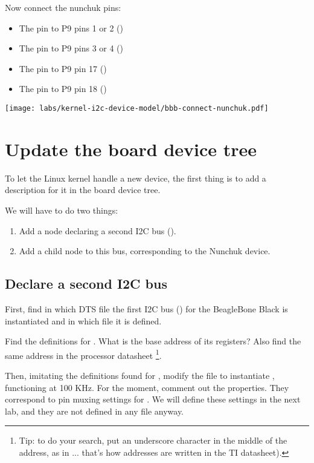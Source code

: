 Now connect the nunchuk pins:
\begin{itemize}
\item The  pin to P9 pins 1 or 2 ()
\item The  pin to P9 pins 3 or 4 ()
\item The  pin to P9 pin 17 ()
\item The  pin to P9 pin 18 ()
\end{itemize}

\begin{center}
\texttt{[image: labs/kernel-i2c-device-model/bbb-connect-nunchuk.pdf]}
\end{center}

\section{Update the board device tree}

To let the Linux kernel handle a new device, the first thing is to add a
description for it in the board device tree.

We will have to do two things:

\begin{enumerate}
\item Add a node declaring a second I2C bus ().
\item Add a child node to this bus, corresponding to the Nunchuk device. 
\end{enumerate}

\subsection{Declare a second I2C bus}

First, find in which DTS file the first I2C bus () for the 
BeagleBone Black is instantiated and in which file it is defined.

Find the definitions for . What is the base address of its
registers? Also find the same address in the processor datasheet
\footnote{Tip: to do your search, put an underscore character in the middle
of the address, as in ... that's how addresses are written in the
TI datasheet).}.

Then, imitating the definitions found for ,
modify the 
file to instantiate , functioning at 100 KHz.
For the moment, comment out the  properties.
They correspond to pin muxing settings for . We will define
these settings in the next lab, and they are not defined in
any  file anyway. 

